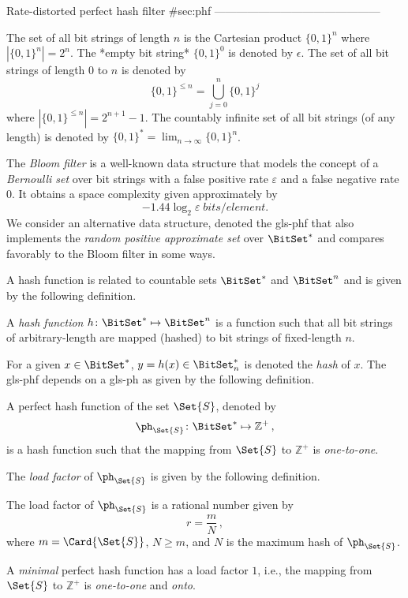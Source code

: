Rate-distorted perfect hash filter {#sec:phf}
---------------------------------------------

The set of all bit strings of length $n$ is the Cartesian product $\{0,1\}^n$ where $|\{0,1\}^n| = 2^n$.
The *empty bit string* $\{0,1\}^0$ is denoted by $\epsilon$.
The set of all bit strings of length $0$ to $n$ is denoted by
$$
\{0,1\}^{\leq n} = \bigcup_{j=0}^{n} \{0,1\}^j
$$
where $|\{0,1\}^{\leq n}| = 2^{n+1} - 1$.
The countably infinite set of all bit strings (of any length) is denoted by
$\{0,1\}^* = \lim_{n \to \infty} \{0,1\}^n$.

The \emph{Bloom filter}\cite{bf} is a well-known data structure that models
the concept of a \emph{Bernoulli set} over bit strings with a false positive
rate $\varepsilon$ and a false negative rate $0$.
It obtains a space complexity given approximately by
\begin{equation}
    -1.44 \log_2 \varepsilon \; \si{bits \per element}.
\end{equation}
We consider an alternative data structure, denoted the \gls{gls-phf} that also implements the \emph{random positive approximate set} over $\BitSet^*$ and compares favorably to the Bloom filter in some ways.

A hash function is related to countable sets $\BitSet^*$ and $\BitSet^n$ and is given by the following definition.
\begin{definition}
A \emph{hash function} $h \colon \BitSet^* \mapsto \BitSet^n$ is a function such that all bit strings of arbitrary-length are mapped (hashed) to bit strings of fixed-length $n$.
\end{definition}
For a given $x \in \BitSet^*$, $y = h(x) \in \BitSet^*_n$ is denoted the \emph{hash} of $x$. The \gls{gls-phf} depends on a \gls{gls-ph} as given by the following definition.
\begin{definition}
A perfect hash function of the set $\Set{S}$, denoted by
\begin{equation}
    \ph_{\Set{S}} \colon \BitSet^* \mapsto \mathbb{Z}^{+}\,,
\end{equation}
is a hash function such that the mapping from $\Set{S}$ to $\mathbb{Z}^+$ is \emph{one-to-one}.
\end{definition}
The \emph{load factor} of $\ph_{\Set{S}}$ is given by the following definition.
\begin{definition}
\label{def:loadfactor}
The load factor of $\ph_{\Set{S}}$ is a rational number given by
\begin{equation}
\label{eq:loadfactor}
    r = \frac{m}{N}\,,
\end{equation}
where $m = \Card{\Set{S}}$, $N \geq m$, and $N$ is the maximum hash of $\ph_{\Set{S}}$.
\end{definition}
\begin{definition}
A \emph{minimal} perfect hash function has a load factor $1$, i.e., the mapping from $\Set{S}$ to $\mathbb{Z}^+$ is \emph{one-to-one} and \emph{onto}.
\end{definition}

